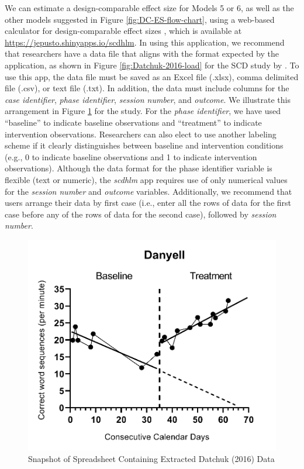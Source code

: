\documentclass[
]{book}
\begin{document}
We can estimate a design-comparable effect size for Models 5 or 6, as well as the other models suggested in Figure \ref{fig:DC-ES-flow-chart}, using a web-based calculator for design-comparable effect sizes \citep{pustejovsky2021scdhlm}, which is available at \url{https://jepusto.shinyapps.io/scdhlm}. In using this application, we recommend that researchers have a data file that aligns with the format expected by the application, as shown in Figure \ref{fig:Datchuk-2016-load} for the SCD study by \citet{datchuk2016Writing}. To use this app, the data file must be saved as an Excel file (.xlsx), comma delimited file (.csv), or text file (.txt). In addition, the data must include columns for the \emph{case identifier}, \emph{phase identifier}, \emph{session number}, and \emph{outcome}. We illustrate this arrangement in Figure \ref{fig:Datchuk-2016-excel} for the \citet{datchuk2016Writing} study. For the \emph{phase identifier}, we have used ``baseline'' to indicate baseline observations and ``treatment'' to indicate intervention observations. Researchers can also elect to use another labeling scheme if it clearly distinguishes between baseline and intervention conditions (e.g., 0 to indicate baseline observations and 1 to indicate intervention observations). Although the data format for the phase identifier variable is flexible (text or numeric), the \emph{scdhlm} app requires use of only numerical values for the \emph{session number} and \emph{outcome} variables. Additionally, we recommend that users arrange their data by first case (i.e., enter all the rows of data for the first case before any of the rows of data for the second case), followed by \emph{session number}.

\begin{figure}
\includegraphics[width=0.75\linewidth]{images/Datchuk2016_Danyell} \caption{Snapshot of Spreadsheet Containing Extracted Datchuk (2016) Data}\label{fig:Datchuk-2016-excel}
\end{figure}
\end{document}
